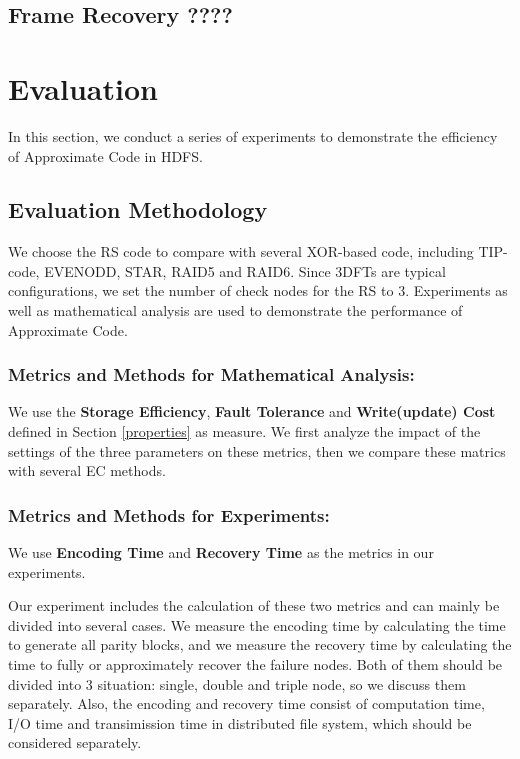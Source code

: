 \documentclass[sigconf]{acmart}
\begin{document}
\subsection{Frame Recovery ????}
\fi


\section{Evaluation}\label{evaluation}
In this section, we conduct a series of experiments to demonstrate the efficiency of Approximate Code in HDFS. 
\subsection{Evaluation Methodology }
We choose the RS code to compare with several XOR-based code, including TIP-code, EVENODD, STAR, RAID5 and RAID6. Since 3DFTs are typical configurations, we set the number of check nodes for the RS to 3.
Experiments as well as mathematical analysis are used to demonstrate the performance of Approximate Code.

\subsubsection{Metrics and Methods for Mathematical Analysis: }
We use the \textbf{Storage Efficiency}, \textbf{Fault Tolerance} and \textbf{Write(update) Cost} defined in Section \ref{properties} as measure.
We first analyze the impact of the settings of the three parameters on these metrics, then we compare these matrics with several EC methods.

\subsubsection{Metrics and Methods for Experiments: }
We use \textbf{Encoding Time} and \textbf{Recovery Time} as the metrics in our experiments.

Our experiment includes the calculation of these two metrics and can mainly be divided into several cases.
We measure the encoding time by calculating the time to generate all parity blocks, and we measure the recovery time by calculating the time to fully or approximately recover the failure nodes.
Both of them should be divided into 3 situation: single, double and triple node, so we discuss them separately.
Also, the encoding and recovery time consist of computation time, I/O time and transimission time in distributed file system, which should be considered separately.
\end{document}
